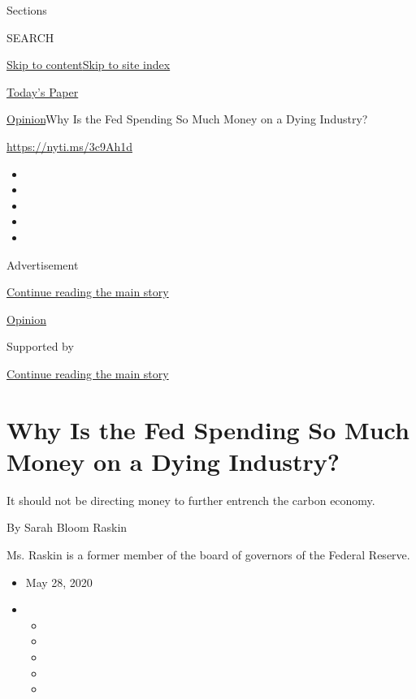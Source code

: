 Sections

SEARCH

\protect\hyperlink{site-content}{Skip to
content}\protect\hyperlink{site-index}{Skip to site index}

\href{https://myaccount.nytimes.com/auth/login?response_type=cookie\&client_id=vi}{}

\href{https://www.nytimes.com/section/todayspaper}{Today's Paper}

\href{/section/opinion}{Opinion}\textbar{}Why Is the Fed Spending So
Much Money on a Dying Industry?

\href{https://nyti.ms/3c9Ah1d}{https://nyti.ms/3c9Ah1d}

\begin{itemize}
\item
\item
\item
\item
\item
\end{itemize}

Advertisement

\protect\hyperlink{after-top}{Continue reading the main story}

\href{/section/opinion}{Opinion}

Supported by

\protect\hyperlink{after-sponsor}{Continue reading the main story}

\hypertarget{why-is-the-fed-spending-so-much-money-on-a-dying-industry}{%
\section{Why Is the Fed Spending So Much Money on a Dying
Industry?}\label{why-is-the-fed-spending-so-much-money-on-a-dying-industry}}

It should not be directing money to further entrench the carbon economy.

By Sarah Bloom Raskin

Ms. Raskin is a former member of the board of governors of the Federal
Reserve.

\begin{itemize}
\item
  May 28, 2020
\item
  \begin{itemize}
  \item
  \item
  \item
  \item
  \item
  \end{itemize}
\end{itemize}

